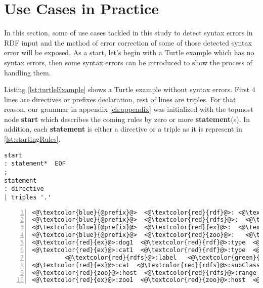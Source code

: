 \vspace{-5mm}

\section{Use Cases in Practice}
In this section, some of use cases tackled in this study to detect syntax errors in RDF input and  the method of error correction of some of those detected syntax error will be exposed. As a start, let's begin with a Turtle example which has no syntax errors, then some syntax errors can be introduced to show the process of handling them. 
	\vspace{5mm} %

Listing \ref{lst:turtleExample} shows a Turtle example without syntax errors. First 4 lines are directives or prefixes declaration, rest of lines are triples.  For that reason, our grammar in appendix \ref{ch:appendix} was initialized with the topmost node \textbf{start}  which describes the coming rules by zero or more  \textbf{statement}(s). In addition, each \textbf{statement} is either a directive or a triple as it is represent in \ref{lst:startingRules}.

\begin{lstlisting}[label=lst:startingRules, caption={Starting rules in the grammar file}] 
start
: statement*  EOF
;
statement
: directive
| triples '.'
\end{lstlisting}

\begin{lstlisting}[label=lst:turtleExample, numbers=left, caption={RDF example in Turtle serialization format}]
<@\textcolor{blue}{@prefix}@>  <@\textcolor{red}{rdf}@>: <@\textcolor{orange}{<http://www.w3.org/1999/02/22-rdf-syntax-ns#>}@> .
<@\textcolor{blue}{@prefix}@>  <@\textcolor{red}{rdfs}@>:  <@\textcolor{orange}{<http://www.w3.org/2000/01/rdf-schema#>}@> .
<@\textcolor{blue}{@prefix}@>  <@\textcolor{red}{ex}@>:  <@\textcolor{orange}{<http://example.org/>}@> .
<@\textcolor{blue}{@prefix}@>  <@\textcolor{red}{zoo}@>:   <@\textcolor{orange}{<http://example.org/zoo/> }@> .
<@\textcolor{red}{ex}@>:dog1  <@\textcolor{red}{rdf}@>:type  <@\textcolor{red}{ex}@>:animal .
<@\textcolor{red}{ex}@>:cat1  <@\textcolor{red}{rdf}@>:type  <@\textcolor{red}{ex}@>:cat ;
         <@\textcolor{red}{rdfs}@>:label   <@\textcolor{green}{"Lusi"@en}@> .
<@\textcolor{red}{ex}@>:cat  <@\textcolor{red}{rdfs}@>:subClassOf  <@\textcolor{red}{ex}@>:animal .
<@\textcolor{red}{zoo}@>:host  <@\textcolor{red}{rdfs}@>:range  <@\textcolor{red}{ex}@>:animal .
<@\textcolor{red}{ex}@>:zoo1  <@\textcolor{red}{zoo}@>:host  <@\textcolor{red}{ex}@>:cat2 .
\end{lstlisting}



